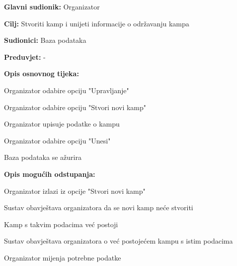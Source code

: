 					\noindent {}
					\begin{packed_item}
						
						\item \textbf{Glavni sudionik: } Organizator
						\item  \textbf{Cilj:} Stvoriti kamp i unijeti informacije o održavanju kampa
						\item  \textbf{Sudionici:} Baza podataka
						\item  \textbf{Preduvjet:} -
						\item  \textbf{Opis osnovnog tijeka:}
						
						\item[] \begin{packed_enum}
							
							\item Organizator odabire opciju "Upravljanje"
							\item Organizator odabire opciju "Stvori novi kamp"
							\item Organizator upisuje podatke o kampu
							\item Organizator odabire opciju "Unesi"
							\item Baza podataka se ažurira
						\end{packed_enum}
						
						\item  \textbf{Opis mogućih odstupanja:}
						
						\item[] \begin{packed_item}
							\item[3.a] Organizator izlazi iz opcije "Stvori novi kamp"
							\item[] \begin{packed_enum}
								
								\item Sustav obavještava organizatora da se novi kamp neće stvoriti
								
							\end{packed_enum}
							
							\item[4.a] Kamp s takvim podacima već postoji
							\item[] \begin{packed_enum}
								
								\item Sustav obavještava organizatora o već postojećem kampu s istim podacima
								\item Organizator mijenja potrebne podatke
								
							\end{packed_enum}
						\end{packed_item}
					\end{packed_item}
					
